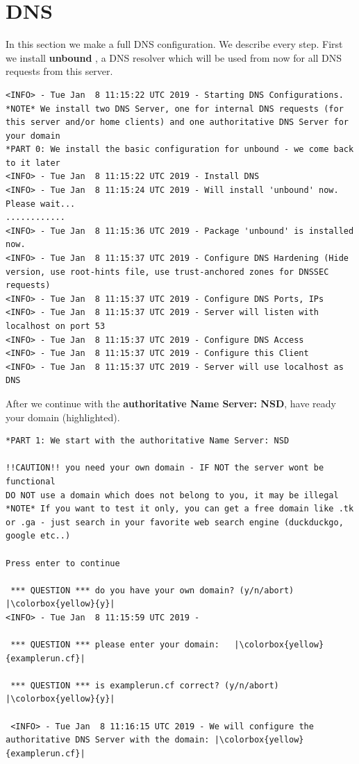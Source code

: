 \section{DNS}
In this section we make a full \gls{DNS} configuration. We describe every step. \newline First we install \textbf{unbound} , a DNS resolver which will be used from now for all DNS requests from this server.
\begin{lstlisting}
<INFO> - Tue Jan  8 11:15:22 UTC 2019 - Starting DNS Configurations.
*NOTE* We install two DNS Server, one for internal DNS requests (for this server and/or home clients) and one authoritative DNS Server for your domain
*PART 0: We install the basic configuration for unbound - we come back to it later
<INFO> - Tue Jan  8 11:15:22 UTC 2019 - Install DNS
<INFO> - Tue Jan  8 11:15:24 UTC 2019 - Will install 'unbound' now. Please wait...
............
<INFO> - Tue Jan  8 11:15:36 UTC 2019 - Package 'unbound' is installed now.
<INFO> - Tue Jan  8 11:15:37 UTC 2019 - Configure DNS Hardening (Hide version, use root-hints file, use trust-anchored zones for DNSSEC requests)
<INFO> - Tue Jan  8 11:15:37 UTC 2019 - Configure DNS Ports, IPs
<INFO> - Tue Jan  8 11:15:37 UTC 2019 - Server will listen with localhost on port 53
<INFO> - Tue Jan  8 11:15:37 UTC 2019 - Configure DNS Access
<INFO> - Tue Jan  8 11:15:37 UTC 2019 - Configure this Client
<INFO> - Tue Jan  8 11:15:37 UTC 2019 - Server will use localhost as DNS
\end{lstlisting}

After we continue with the \textbf{authoritative Name Server: NSD}, have ready your domain (highlighted).
\begin{lstlisting}[escapeinside=||]
*PART 1: We start with the authoritative Name Server: NSD

!!CAUTION!! you need your own domain - IF NOT the server wont be functional
DO NOT use a domain which does not belong to you, it may be illegal
*NOTE* If you want to test it only, you can get a free domain like .tk or .ga - just search in your favorite web search engine (duckduckgo, google etc..)

Press enter to continue

 *** QUESTION *** do you have your own domain? (y/n/abort) |\colorbox{yellow}{y}|
<INFO> - Tue Jan  8 11:15:59 UTC 2019 -

 *** QUESTION *** please enter your domain:   |\colorbox{yellow}{examplerun.cf}|

 *** QUESTION *** is examplerun.cf correct? (y/n/abort)   |\colorbox{yellow}{y}|
 
 <INFO> - Tue Jan  8 11:16:15 UTC 2019 - We will configure the authoritative DNS Server with the domain: |\colorbox{yellow}{examplerun.cf}|
 \end{lstlisting}

